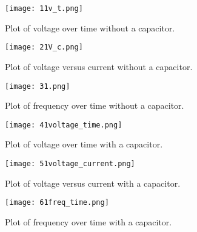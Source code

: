 \begin{figure}[H]
    \centering
    \texttt{[image: 11v\_t.png]}
    \caption{Plot of voltage over time without a capacitor.}
\end{figure}

\begin{figure}[H]
    \centering
    \texttt{[image: 21V\_c.png]}
    \caption{Plot of voltage versus current without a capacitor.}
\end{figure}

\begin{figure}[H]
    \centering
    \texttt{[image: 31.png]}
    \caption{Plot of frequency over time without a capacitor.}
\end{figure}

\begin{figure}[H]
    \centering
    \texttt{[image: 41voltage\_time.png]}
    \caption{Plot of voltage over time with a capacitor.}
\end{figure}

\begin{figure}[H]
    \centering
    \texttt{[image: 51voltage\_current.png]}
    \caption{Plot of voltage versus current with a capacitor.}
\end{figure}

\begin{figure}[H]
    \centering
    \texttt{[image: 61freq\_time.png]}
    \caption{Plot of frequency over time with a capacitor.}
\end{figure}